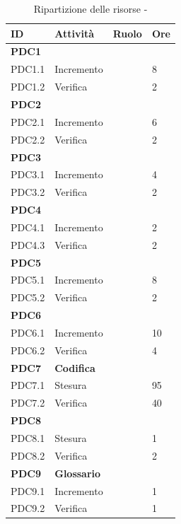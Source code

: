 \documentclass[12pt,a4paper]{article}
\begin{document}
\begin{table}[H]
	\begin{center}
		\begin{tabular}{p{} p{} p{} p{}}
			\toprule
			\textbf{ID}	& \textbf{Attività}	& \textbf{Ruolo} & \textbf{Ore} \\ \midrule
			\midrule
			\textbf{PDC1} & \textbf{\AdR} & &  \\ \midrule
			PDC1.1 & Incremento & \AN & 8 \\ \midrule
			PDC1.2 & Verifica & \VR & 2 \\ \midrule
			\textbf{PDC2} & \textbf{\NdP} &  & \\ \midrule
			PDC2.1 & Incremento & \AM & 6 \\ \midrule
			PDC2.2 & Verifica & \VR & 2 \\ \midrule
			\textbf{PDC3} & \textbf{\PdP} & &  \\ \midrule
			PDC3.1 & Incremento & \RE & 4 \\ \midrule
			PDC3.2 & Verifica & \VR & 2 \\ \midrule
			\textbf{PDC4} & \textbf{\PdQ} & & \\ \midrule
			PDC4.1 & Incremento & \RE \newline \PG & 2 \newline 6 \\ \midrule
			PDC4.3 & Verifica & \VR & 2 \\ \midrule
			\textbf{PDC5} & \textbf{\ST} & & \\ \midrule
			PDC5.1 & Incremento & \PG & 8 \\ \midrule
			PDC5.2 & Verifica & \VR & 2 \\ \midrule
			\textbf{PDC6} & \textbf{\DP} & & \\ \midrule
			PDC6.1 & Incremento & \PG & 10 \\ \midrule
			PDC6.2 & Verifica & \VR & 4 \\ \midrule
			\textbf{PDC7} & \textbf{Codifica} & & \\ \midrule
			PDC7.1 & Stesura & \PR & 95 \\ \midrule
			PDC7.2 & Verifica & \VR & 40 \\ \midrule
			\textbf{PDC8} & \textbf{\MU} & & \\ \midrule
			PDC8.1 & Stesura & \AM \newline \PG & 1 \newline 5 \\ \midrule
			PDC8.2 & Verifica & \VR & 2 \\ \midrule
			\textbf{PDC9} & \textbf{Glossario} & & \\ \midrule
			PDC9.1 & Incremento & \VR & 1 \\ \midrule
			PDC9.2 & Verifica & \VR & 1 \\
			\bottomrule
		\end{tabular}
		\caption{Ripartizione delle risorse - \FPDC}
	\end{center}
\end{table}
\end{document}
